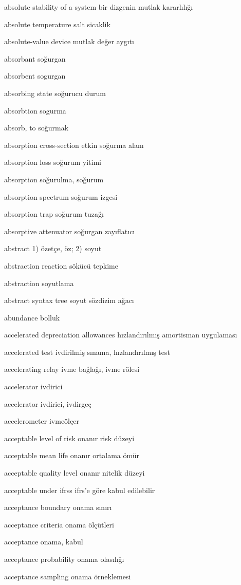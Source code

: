 \documentclass[12pt,fleqn]{article}\usepackage{../../common}
\begin{document}
absolute stability of a system bir dizgenin mutlak kararlılığı

absolute temperature salt sicaklik

absolute-value device mutlak değer aygıtı

absorbant soğurgan

absorbent sogurgan

absorbing state soğurucu durum

absorbtion sogurma

absorb, to soğurmak

absorption cross-section etkin soğurma alanı

absorption loss soğurum yitimi

absorption soğurulma, soğurum

absorption spectrum soğurum izgesi

absorption trap soğurum tuzağı

absorptive attenuator soğurgan zayıflatıcı

abstract 1) özetçe, öz; 2) soyut

abstraction reaction sökücü tepkime

abstraction soyutlama

abstract syntax tree soyut sözdizim ağacı

abundance bolluk

accelerated depreciation allowances hızlandırılmış amortisman uygulaması

accelerated test ivdirilmiş sınama, hızlandırılmış test

accelerating relay ivme bağlağı, ivme rölesi

accelerator ivdirici

accelerator ivdirici, ivdirgeç

accelerometer ivmeölçer

acceptable level of risk onanır risk düzeyi

acceptable mean life onanır ortalama ömür

acceptable quality level onanır nitelik düzeyi

acceptable under ifrss ifrs'e göre kabul edilebilir

acceptance boundary onama sınırı

acceptance criteria onama ölçütleri

acceptance onama, kabul

acceptance probability onama olasılığı

acceptance sampling onama örneklemesi
\end{document}
